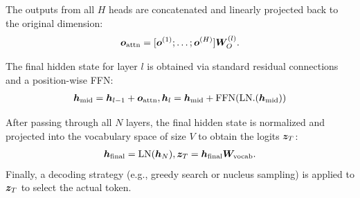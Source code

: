 The outputs from all $H$ heads are concatenated and linearly projected back to the original dimension:
\begin{align}
    \bm{o}_{\text{attn}} = [\bm{o}^{(1)}; \dots; \bm{o}^{(H)}] \bm{W}_O^{(l)}.
\end{align}

The final hidden state for layer $l$ is obtained via standard residual connections and a position-wise FFN:
\begin{align}
    \bm{h}_{\text{mid}} = \bm{h}_{l-1} + \bm{o}_{\text{attn}}, \bm{h}_l = \bm{h}_{\text{mid}} + \text{FFN}(\text{LN}.(\bm{h}_{\text{mid}}))
\end{align}

After passing through all $N$ layers, the final hidden state is normalized and projected into the vocabulary space of size $V$ to obtain the logits $\bm{z}_{T}$:
\begin{align}
    \bm{h}_{\text{final}} = \text{LN}(\bm{h}_N), \bm{z}_{T} = \bm{h}_{\text{final}} \bm{W}_{\text{vocab}}.
\end{align}
Finally, a decoding strategy (e.g., greedy search or nucleus sampling) is applied to $\bm{z}_{T}$ to select the actual token.



